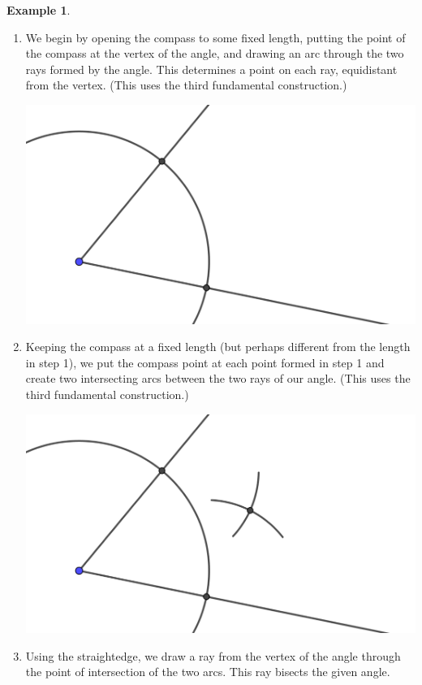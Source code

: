 \documentclass[11pt]{article}
\theoremstyle{definition}
\newtheorem{example}[theorem]{Example}
\begin{document}
\begin{example}
  \begin{enumerate}
    \item We begin by opening the compass to some fixed length, putting the point of the compass at the vertex of the angle, and drawing an arc through the two 
      rays formed by the angle. This determines a point on each ray, equidistant from the vertex. (This uses the third fundamental construction.)
  \begin{center}
    \includegraphics[scale=.75]{Images/bisect_angle_2.png}
  \end{center}
  \item Keeping the compass at a fixed length (but perhaps different from the length in step 1), we put the compass point at each point formed in step 1
    and create two intersecting arcs between the two rays of our angle. (This uses the third fundamental construction.)
  \begin{center}
    \includegraphics[scale=.75]{Images/bisect_angle_3.png}
  \end{center}
  \item Using the straightedge, we draw a ray from the vertex of the angle through the point of intersection of the two arcs. This ray bisects the given angle.

\end{enumerate}
\end{example}
\end{document}
